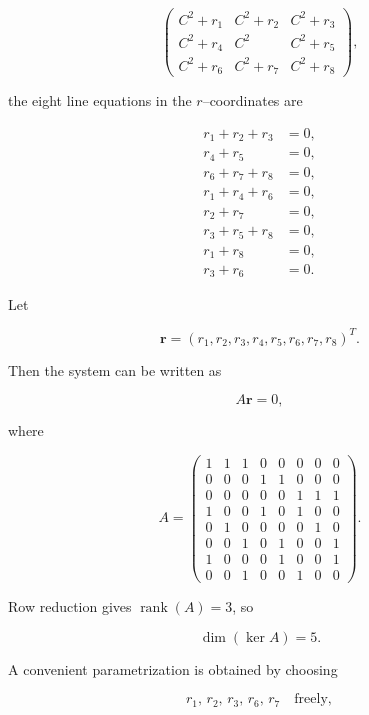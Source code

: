 \documentclass[12pt]{article}
\begin{document}
\[
\begin{pmatrix}
C^{2}+r_{1} & C^{2}+r_{2} & C^{2}+r_{3} \\
C^{2}+r_{4} & C^{2}       & C^{2}+r_{5} \\
C^{2}+r_{6} & C^{2}+r_{7} & C^{2}+r_{8}
\end{pmatrix},
\]


the eight line equations in the $r$–coordinates are


\[
\begin{aligned}
r_{1}+r_{2}+r_{3} &= 0,\\
r_{4}+r_{5} &= 0,\\
r_{6}+r_{7}+r_{8} &= 0,\\
r_{1}+r_{4}+r_{6} &= 0,\\
r_{2}+r_{7} &= 0,\\
r_{3}+r_{5}+r_{8} &= 0,\\
r_{1}+r_{8} &= 0,\\
r_{3}+r_{6} &= 0.
\end{aligned}
\]



Let


\[
\mathbf{r}=(r_{1},r_{2},r_{3},r_{4},r_{5},r_{6},r_{7},r_{8})^{T}.
\]


Then the system can be written as


\[
A\mathbf{r}=0,
\]


where


\[
A=
\begin{pmatrix}
1 & 1 & 1 & 0 & 0 & 0 & 0 & 0\\[4pt]
0 & 0 & 0 & 1 & 1 & 0 & 0 & 0\\[4pt]
0 & 0 & 0 & 0 & 0 & 1 & 1 & 1\\[4pt]
1 & 0 & 0 & 1 & 0 & 1 & 0 & 0\\[4pt]
0 & 1 & 0 & 0 & 0 & 0 & 1 & 0\\[4pt]
0 & 0 & 1 & 0 & 1 & 0 & 0 & 1\\[4pt]
1 & 0 & 0 & 0 & 1 & 0 & 0 & 1\\[4pt]
0 & 0 & 1 & 0 & 0 & 1 & 0 & 0
\end{pmatrix}.
\]



Row reduction gives $\operatorname{rank}(A)=3$, so


\[
\dim(\ker A)=5.
\]



A convenient parametrization is obtained by choosing


\[
r_{1},\, r_{2},\, r_{3},\, r_{6},\, r_{7}
\quad\text{freely},
\]
\end{document}
